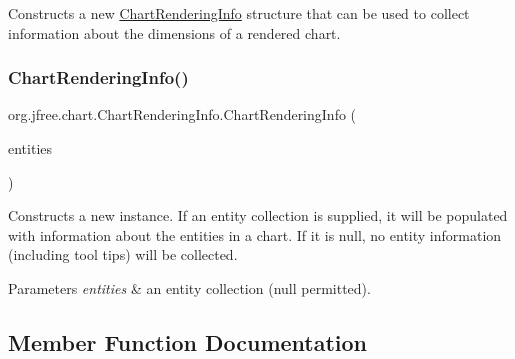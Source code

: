 Constructs a new \mbox{\hyperlink{classorg_1_1jfree_1_1chart_1_1_chart_rendering_info}{Chart\+Rendering\+Info}} structure that can be used to collect information about the dimensions of a rendered chart. \mbox{\label{classorg_1_1jfree_1_1chart_1_1_chart_rendering_info_af0e12c776e631f426b271ccf75653ce2}} 
\subsubsection{\texorpdfstring{Chart\+Rendering\+Info()}{ChartRenderingInfo()}\hspace{0.1cm}{\footnotesize\ttfamily [2/2]}}
{\footnotesize\ttfamily org.\+jfree.\+chart.\+Chart\+Rendering\+Info.\+Chart\+Rendering\+Info (\begin{DoxyParamCaption}\item[{\mbox{\hyperlink{interfaceorg_1_1jfree_1_1chart_1_1entity_1_1_entity_collection}{Entity\+Collection}}}]{entities }\end{DoxyParamCaption})}

Constructs a new instance. If an entity collection is supplied, it will be populated with information about the entities in a chart. If it is {\ttfamily null}, no entity information (including tool tips) will be collected.


\begin{DoxyParams}{Parameters}
{\em entities} & an entity collection ({\ttfamily null} permitted). \\
\hline
\end{DoxyParams}


\subsection{Member Function Documentation}
\mbox{\label{classorg_1_1jfree_1_1chart_1_1_chart_rendering_info_a7b6bba7eab1a5c9dd0bb5d45f18b8801}} 
